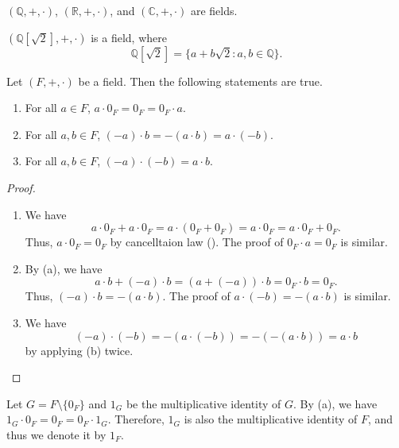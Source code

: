 \begin{example}
  $(\mathbb{Q}, +, \cdot)$, $(\mathbb{R}, +, \cdot)$,
  and $(\mathbb{C}, +, \cdot)$ are fields.
\end{example}

\begin{example}
  $(\mathbb{Q}[\sqrt{2}], +, \cdot)$ is a field, where
  $$
  \mathbb{Q}[\sqrt{2}] = \{a + b\sqrt{2} : a, b \in \mathbb{Q}\}.
  $$
\end{example}

\begin{theorem}\label{thm:field-multiplication}
  Let $(F, +, \cdot)$ be a field. Then the following statements are true.
  \begin{enumerate}
    \item For all $a \in F$, $a \cdot 0_F = 0_F = 0_F \cdot a$.
    \item For all $a, b \in F$, $(-a) \cdot b = -(a \cdot b) = a \cdot (-b)$.
    \item For all $a, b \in F$, $(-a) \cdot (-b) = a \cdot b$.
  \end{enumerate}
\end{theorem}
\begin{proof} \leavevmode
  \begin{enumerate}
    \item We have
      $$
      a \cdot 0_F + a \cdot 0_F
      = a \cdot (0_F + 0_F)
      = a \cdot 0_F
      = a \cdot 0_F + 0_F.
      $$
      Thus, $a \cdot 0_F = 0_F$ by cancelltaion law
      (). The proof of $0_F \cdot a = 0_F$ is similar.
    \item By (a), we have
      $$
      a \cdot b + (-a) \cdot b
      = (a + (-a)) \cdot b
      = 0_F \cdot b
      = 0_F.
      $$
      Thus, $(-a) \cdot b = -(a \cdot b)$.
      The proof of $a \cdot (-b) = -(a \cdot b)$ is similar.
    \item We have
      $$
      (-a) \cdot (-b) = -(a \cdot (-b)) = -(-(a \cdot b)) = a \cdot b
      $$
      by applying (b) twice. \qedhere
  \end{enumerate}
\end{proof}

\begin{remark}
  Let $G = F \setminus \{0_F\}$ and $1_G$ be the multiplicative identity of
  $G$.
  By  (a), we have
  $1_G \cdot 0_F = 0_F = 0_F \cdot 1_G$.
  Therefore, $1_G$ is also the multiplicative identity of $F$, and thus we
  denote it by $1_F$.
\end{remark}

